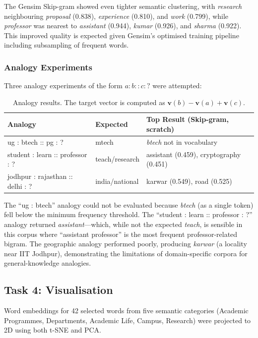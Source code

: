 \documentclass[12pt, a4paper]{article}
\begin{document}
The Gensim Skip-gram showed even tighter semantic clustering, with \emph{research} neighbouring \emph{proposal} (0.838), \emph{experience} (0.810), and \emph{work} (0.799), while \emph{professor} was nearest to \emph{assistant} (0.944), \emph{kumar} (0.926), and \emph{sharma} (0.922). This improved quality is expected given Gensim's optimised training pipeline including subsampling of frequent words.

\subsubsection{Analogy Experiments}

Three analogy experiments of the form $a : b :: c : ?$ were attempted:

\begin{table}[H]
\centering
\caption{Analogy results. The target vector is computed as $\mathbf{v}(b) - \mathbf{v}(a) + \mathbf{v}(c)$.}
\label{tab:analogies}
\small
\begin{tabular}{p{4.5cm}p{3cm}p{5.5cm}}
\toprule
\textbf{Analogy} & \textbf{Expected} & \textbf{Top Result (Skip-gram, scratch)} \\
\midrule
ug : btech :: pg : ?          & mtech       & \emph{btech} not in vocabulary \\
student : learn :: professor : ? & teach/research & assistant (0.459), cryptography (0.451) \\
jodhpur : rajasthan :: delhi : ? & india/national & karwar (0.549), road (0.525) \\
\bottomrule
\end{tabular}
\end{table}

The ``ug : btech'' analogy could not be evaluated because \emph{btech} (as a single token) fell below the minimum frequency threshold. The ``student : learn :: professor : ?'' analogy returned \emph{assistant}---which, while not the expected \emph{teach}, is sensible in this corpus where ``assistant professor'' is the most frequent professor-related bigram. The geographic analogy performed poorly, producing \emph{karwar} (a locality near IIT Jodhpur), demonstrating the limitations of domain-specific corpora for general-knowledge analogies.

\subsection{Task 4: Visualisation}

Word embeddings for 42 selected words from five semantic categories (Academic Programmes, Departments, Academic Life, Campus, Research) were projected to 2D using both t-SNE and PCA.
\end{document}
